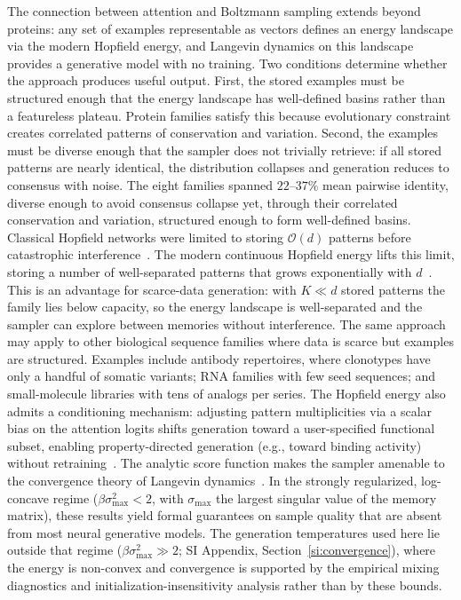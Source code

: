 The connection between attention and Boltzmann sampling extends beyond proteins: any set of examples representable as vectors defines an energy landscape via the modern Hopfield energy, and Langevin dynamics on this landscape provides a generative model with no training. Two conditions determine whether the approach produces useful output. First, the stored examples must be structured enough that the energy landscape has well-defined basins rather than a featureless plateau. Protein families satisfy this because evolutionary constraint creates correlated patterns of conservation and variation. Second, the examples must be diverse enough that the sampler does not trivially retrieve: if all stored patterns are nearly identical, the distribution collapses and generation reduces to consensus with noise. The eight families spanned $22$--$37\%$ mean pairwise identity, diverse enough to avoid consensus collapse yet, through their correlated conservation and variation, structured enough to form well-defined basins. Classical Hopfield networks were limited to storing $\mathcal{O}(d)$ patterns before catastrophic interference~\cite{hopfieldNeuralNetworksPhysical1982,amitStoringInfiniteNumbers1985}. The modern continuous Hopfield energy lifts this limit, storing a number of well-separated patterns that grows exponentially with $d$~\cite{ramsauerHopfieldNetworksAll2021}. This is an advantage for scarce-data generation: with $K \ll d$ stored patterns the family lies below capacity, so the energy landscape is well-separated and the sampler can explore between memories without interference. The same approach may apply to other biological sequence families where data is scarce but examples are structured. Examples include antibody repertoires, where clonotypes have only a handful of somatic variants; RNA families with few seed sequences; and small-molecule libraries with tens of analogs per series. The Hopfield energy also admits a conditioning mechanism: adjusting pattern multiplicities via a scalar bias on the attention logits shifts generation toward a user-specified functional subset, enabling property-directed generation (e.g., toward binding activity) without retraining~\cite{varnerConditioningProtein2026}. The analytic score function makes the sampler amenable to the convergence theory of Langevin dynamics~\cite{durmusNonasymptoticAnalysisUnadjusted2017,dalalyanTheoreticalGuaranteesApproximate2017}. In the strongly regularized, log-concave regime ($\beta\sigma_{\max}^2 < 2$, with $\sigma_{\max}$ the largest singular value of the memory matrix), these results yield formal guarantees on sample quality that are absent from most neural generative models. The generation temperatures used here lie outside that regime ($\beta\sigma_{\max}^2 \gg 2$; SI Appendix, Section~\ref{si:convergence}), where the energy is non-convex and convergence is supported by the empirical mixing diagnostics and initialization-insensitivity analysis rather than by these bounds.

